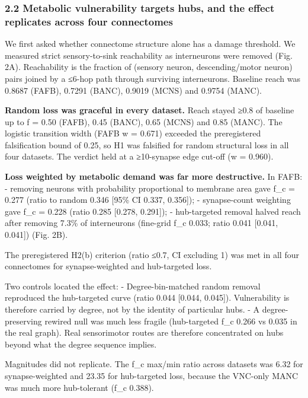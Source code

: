 \documentclass[11pt]{article}
\begin{document}
\subsubsection{2.2 Metabolic vulnerability targets hubs, and the effect replicates across four connectomes}\label{metabolic-vulnerability-targets-hubs-and-the-effect-replicates-across-four-connectomes}

We first asked whether connectome structure alone has a damage threshold. We measured strict sensory-to-sink reachability as interneurons were removed (Fig. 2A). Reachability is the fraction of (sensory neuron, descending/motor neuron) pairs joined by a ≤6-hop path through surviving interneurons. Baseline reach was 0.8687 (FAFB), 0.7291 (BANC), 0.9019 (MCNS) and 0.9754 (MANC).

\textbf{Random loss was graceful in every dataset.} Reach stayed ≥0.8 of baseline up to f = 0.50 (FAFB), 0.45 (BANC), 0.65 (MCNS) and 0.85 (MANC). The logistic transition width (FAFB w = 0.671) exceeded the preregistered falsification bound of 0.25, so H1 was falsified for random structural loss in all four datasets. The verdict held at a ≥10-synapse edge cut-off (w = 0.960).

\textbf{Loss weighted by metabolic demand was far more destructive.} In FAFB:
- removing neurons with probability proportional to membrane area gave f\_c = 0.277 (ratio to random 0.346 {[}95\% CI 0.337, 0.356{]});
- synapse-count weighting gave f\_c = 0.228 (ratio 0.285 {[}0.278, 0.291{]});
- hub-targeted removal halved reach after removing 7.3\% of interneurons (fine-grid f\_c 0.033; ratio 0.041 {[}0.041, 0.041{]}) (Fig. 2B).

The preregistered H2(b) criterion (ratio ≤0.7, CI excluding 1) was met in all four connectomes for synapse-weighted and hub-targeted loss.

Two controls located the effect:
- Degree-bin-matched random removal reproduced the hub-targeted curve (ratio 0.044 {[}0.044, 0.045{]}). Vulnerability is therefore carried by degree, not by the identity of particular hubs.
- A degree-preserving rewired null was much less fragile (hub-targeted f\_c 0.266 vs 0.035 in the real graph). Real sensorimotor routes are therefore concentrated on hubs beyond what the degree sequence implies.

Magnitudes did not replicate. The f\_c max/min ratio across datasets was 6.32 for synapse-weighted and 23.35 for hub-targeted loss, because the VNC-only MANC was much more hub-tolerant (f\_c 0.388).
\end{document}
